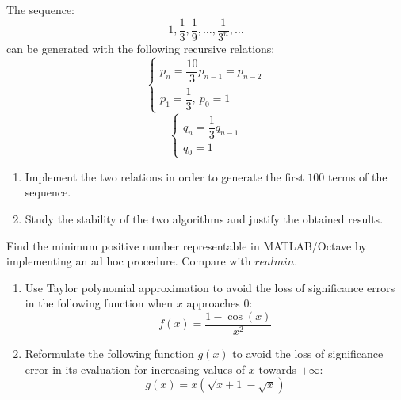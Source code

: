 \documentclass[12pt, a4paper]{report}
\newtheorem[style=M,bodystyle=\normalfont]{theorem}{Theorem}
\newtheorem[style=M,bodystyle=\normalfont]{corollary}{Corollary}
\newtheorem[style=M,bodystyle=\normalfont]{lemma}{Lemma}
\newtheorem[style=M,bodystyle=\normalfont]{definition}{Definition}
\begin{document}
    \newpage

    \begin{Exercise}[label=8]
        The sequence: 
        \[1, \dfrac{1}{3}, \dfrac{1}{9}, \dots, \dfrac{1}{3^n},\dots\]
        can be generated with the following recursive relations: 
        \[
        \begin{cases}
            p_n=\dfrac{10}{3}p_{n-1}=p_{n-2}  \\
            p_1 = \dfrac{1}{3}, \: p_0=1
        \end{cases}
        \]
        \[
        \begin{cases}
            q_n=\dfrac{1}{3}q_{n-1}  \\
            q_0=1
        \end{cases}
        \]
        \begin{enumerate}
            \item Implement the two relations in order to generate the first $100$ terms of the sequence.
            \item Study the stability of the two algorithms and justify the obtained results. 
        \end{enumerate}
    \end{Exercise}
    \begin{Answer}[ref=8]
        
    \end{Answer}

    \newpage

    \begin{Exercise}[label=9]
        Find the minimum positive number representable in MATLAB/Octave by implementing an ad hoc procedure. Compare with $realmin$.
    \end{Exercise}
    \begin{Answer}[ref=9]
        
    \end{Answer}

    \newpage

    \begin{Exercise}[label=10]
        \begin{enumerate}
            \item Use Taylor polynomial approximation to avoid the loss of significance errors in the following function when $x$ approaches $0$:
                \[f(x)=\dfrac{1-\cos(x)}{x^2}\]
            \item Reformulate the following function $g(x)$ to avoid the loss of significance error in its evaluation for increasing values of $x$ towards $+ \infty$:
                \[g(x)=x \left( \sqrt{x+1} - \sqrt{x} \right)\]
        \end{enumerate}
    \end{Exercise}
    \begin{Answer}[ref=10]
        
    \end{Answer}
\end{document}
